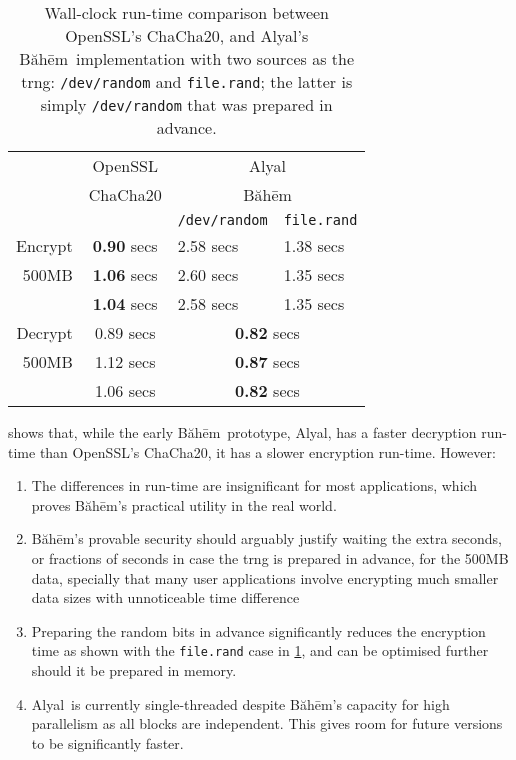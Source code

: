 \documentclass[twocolumn,hidelinks]{article}
\newcommand{\baheem}{Băhēm}
\newcommand{\alyal}{Alyal}
\begin{document}
\begin{table}[tbh]
    \centering
    \begin{tabular}{rcll}
                & OpenSSL            & \multicolumn{2}{c}{\alyal}                \\
                & ChaCha20           & \multicolumn{2}{c}{\baheem}               \\
                &                    & \texttt{/dev/random} & \texttt{file.rand} \\\hline
        Encrypt & \textbf{0.90} secs & 2.58 secs            & 1.38 secs          \\
        500MB   & \textbf{1.06} secs & 2.60 secs            & 1.35 secs          \\
                & \textbf{1.04} secs & 2.58 secs            & 1.35 secs          \\\hline
        Decrypt & 0.89 secs          & \multicolumn{2}{c}{\textbf{0.82} secs}    \\
        500MB   & 1.12 secs          & \multicolumn{2}{c}{\textbf{0.87} secs}    \\
                & 1.06 secs          & \multicolumn{2}{c}{\textbf{0.82} secs}    \\
    \end{tabular}
    \caption{Wall-clock run-time comparison between OpenSSL's ChaCha20, and
    \alyal's \baheem\ implementation with two sources as the \gls{trng}:
    \texttt{/dev/random} and \texttt{file.rand};  the latter is simply
    \texttt{/dev/random} that was prepared in advance.}
    \label{tbl_benchmark}
\end{table}

 shows that, while the early \baheem\ prototype,
\alyal, has a faster decryption run-time than OpenSSL's ChaCha20, it has
a slower encryption run-time. However:
\begin{enumerate}
    \item The differences in run-time are insignificant for most
        applications, which proves \baheem's practical utility in the real
        world.
    \item \baheem's provable security should arguably justify waiting the
        extra seconds, or fractions of seconds in case the \gls{trng} is
        prepared in advance, for the 500MB data, specially that many user
        applications involve encrypting much smaller data sizes with
        unnoticeable time difference
    \item Preparing the random bits in advance significantly reduces the
        encryption time as shown with the \texttt{file.rand} case in
        \cref{tbl_benchmark}, and can be optimised further should it be
        prepared in memory.
    \item \alyal\ is currently single-threaded despite \baheem's capacity
        for high parallelism as all blocks are independent. This gives room
        for future versions to be significantly faster.
\end{enumerate}
\end{document}
